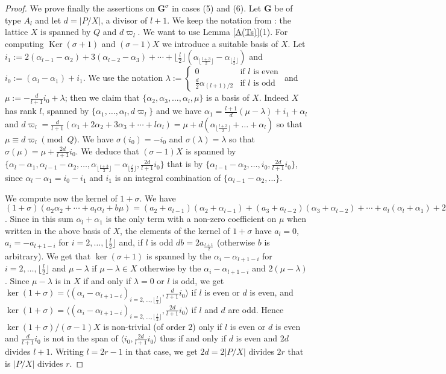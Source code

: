\documentclass{amsart}
\numberwithin{equation}{section}
\theoremstyle{definition}
\theoremstyle{remark}
\newcommand\bG{{\mathbf G}}
\newcommand\Gs{{\bG^\sigma}}
\DeclareMathOperator\Ker{\mathrm{Ker}}
\newcommand\genby[1]{\mathopen\langle#1\mathclose\rangle}
\begin{document}
\begin{proof}
We prove finally the assertions on $\Gs$ in cases (5) and (6).
Let $\bG$ be of type $A_l$ and  let $d=|P/X|$, a divisor of $l+1$.
We keep the notation from \cite[Planche  I]{Bou}:
the lattice $X$ is spanned by $Q$ and $d\varpi_l$.
We  want to  use Lemma  \ref{A(Ts)}(1). For  computing $\Ker(\sigma+1)$ and
$(\sigma-1)X$ we introduce a suitable basis of $X$. Let
$i_1:=2(\alpha_{l-1}-\alpha_2)+3(\alpha_{l-2}-\alpha_3)+\cdots+
\lfloor\frac{l}{2}\rfloor(\alpha_{\lfloor
\frac{l+3}{2}\rfloor}-\alpha_{\lfloor\frac{l}{2}\rfloor})$
and $i_0:=(\alpha_l-\alpha_1)+i_1$.  We use the notation $\lambda:=\begin{cases}
0&\text{if $l$ is even}\\\frac{d}{2}\alpha_{(l+1)/2}&\text
{if $l$ is odd}\end{cases}$  and  $\mu:=-\frac{d}{l+1}  i_0+\lambda$;  then  we
claim  that $\{\alpha_2,\alpha_3,\ldots,\alpha_l,\mu\}$ is a basis of $X$.
Indeed  $X$ has rank $l$, spanned by $\{\alpha_1,\ldots,\alpha_l,d\varpi_l\}$
and  we  have $\alpha_1=\frac{l+1}{d}(\mu-\lambda)+i_1+\alpha_l$ and
$d\varpi_l=\frac{d}{l+1}(\alpha_1+2\alpha_2+3\alpha_3+\cdots+l\alpha_l)=
\mu+d(\alpha_{\lfloor\frac{l+3}2\rfloor}+\ldots+\alpha_l)$  so
that $\mu\equiv d\varpi_l\pmod Q$. We have $\sigma(i_0)=-i_0$ and
$\sigma(\lambda)=\lambda$ so that $\sigma(\mu)=\mu+\frac{2d}{l+1}i_0$.
We deduce that $(\sigma-1)X$ is spanned by
$\{\alpha_l-\alpha_1,\alpha_{l-1}-\alpha_2,\ldots,\alpha_{\lfloor
\frac{l+3}{2}\rfloor}-\alpha_{\lfloor\frac{l}{2}\rfloor},
\frac{2d}{l+1}i_0\}$ that is by
$\{\alpha_{l-1}-\alpha_2,\ldots,i_0,\frac{2d}{l+1}i_0\}$, since 
$\alpha_l-\alpha_1=i_0-i_1$ and $i_1$ is an integral combination
of $\{\alpha_{l-1}-\alpha_2,\ldots\}$.

We compute now the kernel of $1+\sigma$. We have
$(1+\sigma)(a_2\alpha_2+\cdots+a_l\alpha_l+b\mu)=
(a_2+a_{l-1})(\alpha_2+\alpha_{l-1})+(a_3+a_{l-2})(\alpha_3+\alpha_{l-2})+\cdots
+a_l(\alpha_l+\alpha_1)+2b\lambda\}$.
Since in this sum $\alpha_l+\alpha_1$ is the only term with a non-zero coefficient 
on $\mu$ when written in the above basis of $X$,
the elements of the kernel of $1+\sigma$ have $a_l=0$, $a_i=-a_{l+1-i}$  for
$i=2,\ldots,\lfloor\frac l2\rfloor$ and, if $l$ is odd $db=2a_{\frac{l+1}2}$ (otherwise $b$ is
arbitrary). We get that $\ker(\sigma+1)$ is spanned by
the $\alpha_i-\alpha_{l+1-i}$ for $i=2,\ldots,\lfloor\frac l2\rfloor$ and $\mu-\lambda$ if
$\mu-\lambda\in X$ otherwise by the $\alpha_i-\alpha_{l+1-i}$ and $2(\mu-\lambda)$.
Since $\mu-\lambda$ is in $X$ if and only if $\lambda=0$ or $l$ is odd, we get 
$\ker(1+\sigma)=\genby{(\alpha_i-\alpha_{l+1-i})_{i=2,\ldots,\lfloor\frac l2\rfloor},
\frac d{l+1}i_0}$ if $l$ is even or $d$ is
even, and
$\ker(1+\sigma)=\genby{(\alpha_i-\alpha_{l+1-i})_{i=2,\ldots,\lfloor\frac
l2\rfloor},\frac {2d}{l+1}i_0}$
if $l$ and $d$ are odd. Hence $\ker(1+\sigma)/(\sigma-1)X$ is non-trivial 
(of order $2$) only
if $l$ is even or $d$ is even and $\frac d{l+1} i_0$ is not in the span of
$\genby{i_0,\frac{2d}{l+1}i_0}$ thus if and only if $d$ is even and $2d$ divides $l+1$.
Writing $l=2r-1$ in that case, we get $2d=2|P/X|$ divides $2r$ that is $|P/X|$ divides $r$.
\end{proof}
\end{document}
